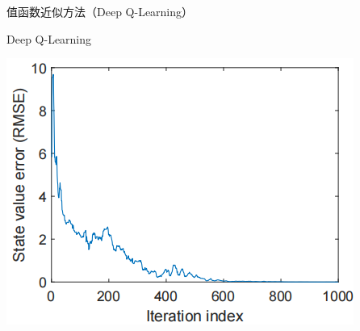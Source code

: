 \begin{section}{值函数近似方法\alert{（Deep Q-Learning）}}
\begin{frame}{Deep Q-Learning}
\begin{center}
\begin{minipage}{0.22\textwidth}
        \end{minipage}
        \hspace{1cm}
        \begin{minipage}{0.22\textwidth}
            \centering
            \includegraphics[width=\linewidth]{assets/DQN1000statevalueerror.png}
        \end{minipage}
    \end{center}
\end{frame}



\end{section}
